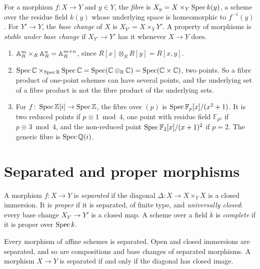 \begin{definition}\label{schemes:definition-fibre}
For a morphism $f \colon X \to Y$ and $y \in Y$, the \emph{fibre} is $X_y = X \times_Y\operatorname{Spec} k(y)$, a scheme over the residue field $k(y)$ whose underlying space
is homeomorphic to $f^{-1}(y)$ \cite[Exercise II.3.10]{hartshorne-ag}. For $Y' \to Y$, the \emph{base change} of $X$ is $X_{Y'} = X \times_YY'$. A property of
morphisms is \emph{stable under base change} if $X_{Y'} \to Y'$ has it whenever $X \to Y$ does.
\end{definition}

\begin{example}\label{schemes:example-fibre-products}
\begin{enumerate}
\item $\mathbb{A}^m_R \times_R \mathbb{A}^n_R = \mathbb{A}^{m+n}_R$, since $R[x] \otimes_RR[y] = R[x, y]$.
\item $\operatorname{Spec}\mathbb{C} \times_{\operatorname{Spec}\mathbb{R}}\operatorname{Spec}\mathbb{C} = \operatorname{Spec}(\mathbb{C} \otimes_{\mathbb{R}}\mathbb{C}) = \operatorname{Spec}(\mathbb{C} \times \mathbb{C})$, two points. So a fibre product of one-point schemes can have
several points, and the underlying set of a fibre product is not the fibre product of the underlying sets.
\item For $f \colon \operatorname{Spec}\mathbb{Z}[i] \to \operatorname{Spec}\mathbb{Z}$, the fibre over $(p)$ is $\operatorname{Spec}\mathbb{F}_p[x]/(x^2 + 1)$. It is two reduced points if $p \equiv 1 \bmod 4$, one
point with residue field $\mathbb{F}_{p^2}$ if $p \equiv 3 \bmod 4$, and the non-reduced point $\operatorname{Spec}\mathbb{F}_2[x]/(x + 1)^2$ if $p = 2$. The
generic fibre is $\operatorname{Spec}\mathbb{Q}(i)$.
\end{enumerate}
\end{example}

\section{Separated and proper morphisms}\label{schemes:section-separated-proper}

\begin{definition}\label{schemes:definition-separated}
A morphism $f \colon X \to Y$ is \emph{separated} if the diagonal $\Delta \colon X \to X \times_YX$ is a closed immersion. It is \emph{proper} if it is
separated, of finite type, and \emph{universally closed}: every base change $X_{Y'} \to Y'$ is a closed map. A scheme over a field $k$ is \emph{complete} if
it is proper over $\operatorname{Spec} k$.
\end{definition}

\begin{proposition}\label{schemes:proposition-affine-separated}
Every morphism of affine schemes is separated. Open and closed immersions are separated, and so are compositions and base changes of separated
morphisms. A morphism $X \to Y$ is separated if and only if the diagonal has closed image.
\end{proposition}

